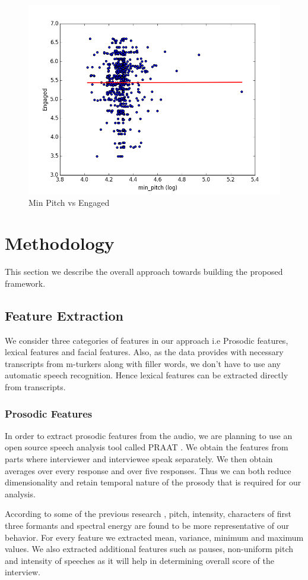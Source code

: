 \documentclass[11pt]{article}
\begin{document}
\begin{figure}[h!]
\begin{center}
\includegraphics[width=0.7\columnwidth]{figures/Engaged and min_pitch.png}
\caption{Min Pitch vs Engaged}
\label{fig:prosodic_analysis4}
\end{center}
\end{figure}
\section{Methodology}
This section we describe the overall approach towards building the proposed framework.
\subsection{Feature Extraction}
We consider three categories of features in our approach i.e Prosodic features, lexical features and facial features. Also, as the data provides with necessary transcripts from m-turkers along with filler words, we don't have to use any automatic speech recognition. Hence lexical features can be extracted directly from transcripts.
\subsubsection{Prosodic Features}
In order to extract prosodic features from the audio, we are planning to use an open source speech analysis tool called PRAAT \cite{naim2015automated}. We obtain the features from parts where interviewer and interviewee speak separately. We then obtain averages over every response and over five responses. Thus we can both reduce dimensionality and retain temporal nature of the prosody that is required for our analysis.

According to some of the previous research \cite{frick1985communicating}, pitch, intensity, characters of first three formants and spectral energy are found to be more representative of our behavior. For every feature we extracted mean, variance, minimum and maximum values. We also extracted additional features such as pauses, non-uniform pitch and intensity of speeches as it will help in determining overall score of the interview.
\end{document}
